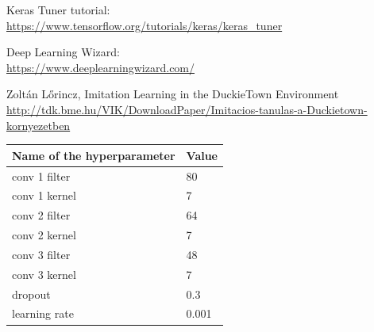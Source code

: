 \documentclass{article}
\begin{document}
Keras Tuner tutorial:
\\
\url{https://www.tensorflow.org/tutorials/keras/keras_tuner}
\vspace*{1\baselineskip}

Deep Learning Wizard:
\\
\url{https://www.deeplearningwizard.com/}
\vspace*{1\baselineskip}

Zoltán Lőrincz, Imitation Learning in the DuckieTown Environment
\\
\url{http://tdk.bme.hu/VIK/DownloadPaper/Imitacios-tanulas-a-Duckietown-kornyezetben}


\begin{center}
\begin{tabular}{ | m{15em} | m{3em}| }
  \hline
  Name of the hyperparameter & Value  \\
  \hline
  \hline
  conv 1 filter & 80  \\
  \hline
  conv 1 kernel & 7 \\
  \hline
    conv 2 filter  & 64 \\
  \hline
    conv 2 kernel & 7 \\
  \hline
    conv 3 filter  & 48 \\
  \hline
    conv 3 kernel & 7 \\
  \hline
    dropout & 0.3 \\
      \hline
    learning rate & 0.001 \\
    \hline
\end{tabular}
\end{center}

\pagebreak

\clearpage
\end{document}
